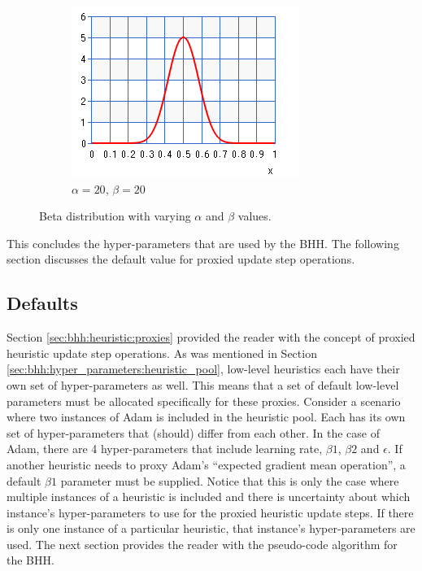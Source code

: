 \begin{figure}[htbp]
      \begin{subfigure}{0.5\textwidth}
            \centering
            \includegraphics[width=\textwidth]{images/beta_20_20.png}
            \caption{$\alpha=20$, $\beta=20$}
            \label{sec:bhh:hyper_parameters:normalisation_beta_20_20}
      \end{subfigure}
      \par\bigskip
      \caption{Beta distribution with varying $\alpha$ and $\beta$ values.}
      \label{sec:bhh:hyper_parameters:discounted_rewards:normalisation}
\end{figure}

This concludes the hyper-parameters that are used by the \ac{BHH}. The following section discusses the default value for proxied update step operations.

\subsection{Defaults}
\label{sec:bhh:hyper_parameters:defaults}

Section \ref{sec:bhh:heuristic:proxies} provided the reader with the concept of proxied heuristic update step operations. As was mentioned in Section \ref{sec:bhh:hyper_parameters:heuristic_pool}, low-level heuristics each have their own set of hyper-parameters as well. This means that a set of default low-level parameters must be allocated specifically for these proxies. Consider a scenario where two instances of \ac{Adam} is included in the heuristic pool. Each has its own set of hyper-parameters that (should) differ from each other. In the case of \ac{Adam}, there are 4 hyper-parameters that include learning rate, $\beta1$, $\beta2$ and $\epsilon$. If another heuristic needs to proxy \ac{Adam}'s ``expected gradient mean operation'', a default $\beta1$ parameter must be supplied. Notice that this is only the case where multiple instances of a heuristic is included and there is uncertainty about which instance's hyper-parameters to use for the proxied heuristic update steps. If there is only one instance of a particular heuristic, that instance's hyper-parameters are used. The next section provides the reader with the pseudo-code algorithm for the \ac{BHH}.


